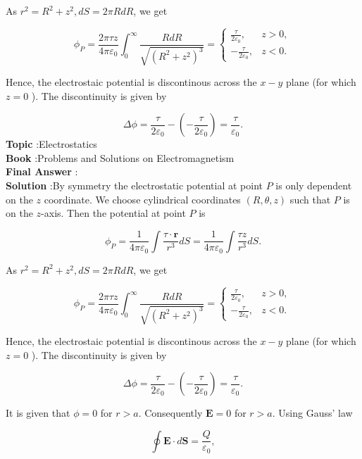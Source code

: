 \documentclass[10pt]{article}
\begin{document}
As $r^{2}=R^{2}+z^{2}, d S=2 \pi R d R$, we get

$$
\phi_{P}=\frac{2 \pi \tau z}{4 \pi \varepsilon_{0}} \int_{0}^{\infty} \frac{R d R}{\sqrt{\left(R^{2}+z^{2}\right)^{3}}}=\left\{\begin{array}{cl}
\frac{\tau}{2 \varepsilon_{0}}, & z>0, \\
-\frac{\tau}{2 \varepsilon_{0}}, & z<0 .
\end{array}\right.
$$

Hence, the electrostaic potential is discontinous across the $x-y$ plane (for which $z=0$ ). The discontinuity is given by

$$
\Delta \phi=\frac{\tau}{2 \varepsilon_{0}}-\left(-\frac{\tau}{2 \varepsilon_{0}}\right)=\frac{\tau}{\varepsilon_{0}} .
$$
\textbf{Topic} :Electrostatics\\
\textbf{Book} :Problems and Solutions on Electromagnetism\\
\textbf{Final Answer} :\\


\textbf{Solution} :By symmetry the electrostatic potential at point $P$ is only dependent on the $z$ coordinate. We choose cylindrical coordinates $(R, \theta, z)$ such that $P$ is on the $z$-axis. Then the potential at point $P$ is

$$
\phi_{P}=\frac{1}{4 \pi \varepsilon_{0}} \int \frac{\tau \cdot \mathbf{r}}{r^{3}} d S=\frac{1}{4 \pi \varepsilon_{0}} \int \frac{\tau z}{r^{3}} d S .
$$

As $r^{2}=R^{2}+z^{2}, d S=2 \pi R d R$, we get

$$
\phi_{P}=\frac{2 \pi \tau z}{4 \pi \varepsilon_{0}} \int_{0}^{\infty} \frac{R d R}{\sqrt{\left(R^{2}+z^{2}\right)^{3}}}=\left\{\begin{array}{cl}
\frac{\tau}{2 \varepsilon_{0}}, & z>0, \\
-\frac{\tau}{2 \varepsilon_{0}}, & z<0 .
\end{array}\right.
$$

Hence, the electrostaic potential is discontinous across the $x-y$ plane (for which $z=0$ ). The discontinuity is given by

$$
\Delta \phi=\frac{\tau}{2 \varepsilon_{0}}-\left(-\frac{\tau}{2 \varepsilon_{0}}\right)=\frac{\tau}{\varepsilon_{0}} .
$$

 It is given that $\phi=0$ for $r>a$. Consequently $\mathbf{E}=0$ for $r>a$. Using Gauss' law

$$
\oint \mathbf{E} \cdot d \mathbf{S}=\frac{Q}{\varepsilon_{0}},
$$
\end{document}
